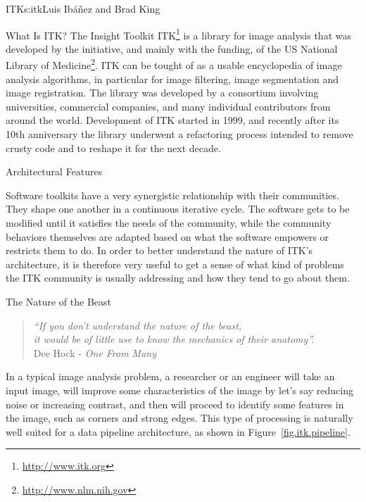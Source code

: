 \begin{aosachapter}{ITK}{s:itk}{Luis Ib\'{a}\~{n}ez and Brad King}


\begin{aosasect1}{What Is ITK?}
The Insight Toolkit ITK\footnote{\url{http://www.itk.org}} is a library for
image analysis that was developed by the initiative, and mainly with the
funding, of the US National Library of
Medicine\footnote{\url{http://www.nlm.nih.gov}}. ITK can be tought of as a
usable encyclopedia of image analysis algorithms, in particular for image
filtering, image segmentation and image registration. The library was developed
by a consortium involving universities, commercial companies, and many
individual contributors from around the world.  Development of ITK started in
1999, and recently after its 10th anniversary the library underwent a
refactoring process intended to remove crusty code and to reshape it for the
next decade.
\end{aosasect1}

\begin{aosasect1}{Architectural Features}

Software toolkits have a very synergistic relationship with their communities.
They shape one another in a continuous iterative cycle.  The software gets to
be modified until it satisfies the needs of the community, while the community
behaviors themselves are adapted based on what the software empowers or
restricts them to do. In order to better understand the nature of ITK's
architecture, it is therefore very useful to get a sense of what kind of
problems the ITK community is usually addressing and how they tend to go about
them.

\begin{aosasect2}{The Nature of the Beast}

\begin{center}
\begin{quotation}
\emph{
``If you don't understand the nature of the beast,\\
it would be of little use to know the mechanics of their anatomy''.\\
}
\hfill Dee Hock - \emph{One From Many}
\end{quotation}
\end{center}

In a typical image analysis problem, a researcher or an engineer will take an
input image, will improve some characteristics of the image by let's say
reducing noise or increasing contrast, and then will proceed to identify some
features in the image, such as corners and strong edges. This type of
processing is naturally well suited for a data pipeline architecture, as
shown in Figure~\ref{fig.itk.pipeline}.


\end{aosasect2}
\end{aosasect1}
\end{aosachapter}
